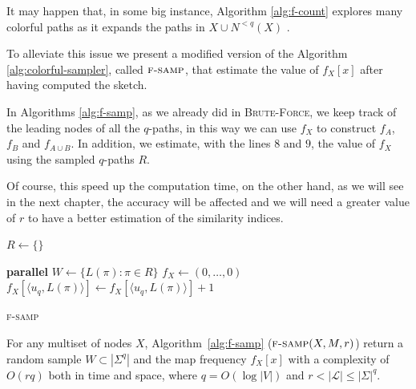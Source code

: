 \clearpage

It may happen that, in some big instance, Algorithm \ref{alg:f-count} explores many colorful paths as it expands the paths in $X \cup N^{<q}(X)$ .

To alleviate this issue we present a modified version of the Algorithm \ref{alg:colorful-sampler}, called $\textsc{f-samp}$, that estimate the value of $f_{X}[x]$ after having computed the sketch.\medskip

In Algorithms \ref{alg:f-samp}, as we already did in \textsc{Brute-Force}, we keep track of the leading nodes of all the $q$-paths, in this way we can use $f_{X}$ to construct $f_A$, $f_B$ and $f_{A \cup B}$. In addition, we estimate, with the lines $8$ and $9$, the value of $f_X$ using the sampled $q$-paths $R$.\medskip

Of course, this speed up the computation time, on the other hand, as we will see in the next chapter, the accuracy will be affected and we will need a greater value of $r$ to have a better estimation of the similarity indices.

\begin{algorithm}[h]
	\small
	\DontPrintSemicolon
	$R \gets \{\}$\;
		
	\BlankLine
	\textbf{parallel} 
	\BlankLine
	$W \gets \{ L(\pi) : \pi \in R \}$\;
	\BlankLine
	$f_X \gets (0,\ldots,0)$\;
	{
		$f_X[\langle u_{q}, L(\pi) \rangle ] \gets f_X[\langle u_{q}, L(\pi) \rangle]+1$
	}
	\BlankLine
	\caption{\textsc{f-samp}}
	\label{alg:f-samp}
\end{algorithm}

\begin{lemma}
	For any multiset of nodes $X$, 
	Algorithm~\ref{alg:f-samp} ($\textsc{f-samp}(X, M, r)$) return a random sample $W \subset |\Sigma^{q}|$ and the map frequency $f_{X}[x]$
	with a complexity of $O(rq)$ both in time and space, 
	where $q = O(\log |V|)$ and $r < |\mathcal{L}| \leq |\Sigma|^{q}$.
\end{lemma}

